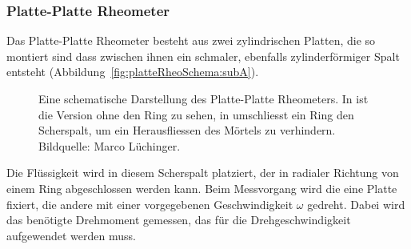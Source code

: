 \subsubsection{Platte-Platte Rheometer}
\label{Kapitel:Parameter:PlattePlatteRheo}
Das Platte-Platte Rheometer besteht aus zwei zylindrischen Platten, die so montiert sind dass zwischen ihnen ein schmaler, ebenfalls zylinderförmiger Spalt entsteht (Abbildung~\ref{fig:platteRheoSchema:subA}).
\begin{figure}
    \centering
    \caption{Eine schematische Darstellung des Platte-Platte Rheometers. In  ist die Version ohne den Ring zu sehen, in  umschliesst ein Ring den Scherspalt, um ein Herausfliessen des Mörtels zu verhindern.\\
    Bildquelle: Marco Lüchinger.}
    \label{fig:kapRheo}
\end{figure}
Die Flüssigkeit wird in diesem Scherspalt platziert, der in radialer Richtung von einem Ring abgeschlossen werden kann. Beim Messvorgang wird die eine Platte fixiert, die andere mit einer vorgegebenen Geschwindigkeit $\omega$ gedreht.
Dabei wird das benötigte Drehmoment gemessen, das für die Drehgeschwindigkeit aufgewendet werden muss.

